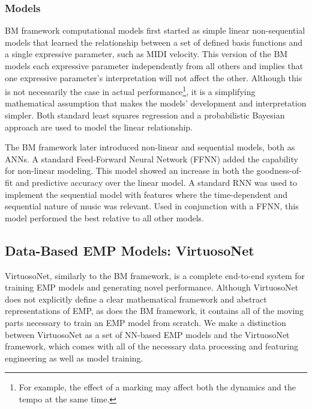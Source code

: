 \subsubsection{Models}
BM framework computational models first started as simple linear non-sequential models that learned the relationship between a set of defined basis functions and a single expressive parameter, such as MIDI velocity. This version of the BM models each expressive parameter independently from all others and implies that one expressive parameter's interpretation will not affect the other. Although this is not necessarily the case in actual performance\footnote{For example, the effect of a  marking may affect both the dynamics and the tempo at the same time.}, it is a simplifying mathematical assumption that makes the models' development and interpretation simpler. Both standard least squares regression and a probabilistic Bayesian approach are used to model the linear relationship. 

The BM framework later introduced non-linear and sequential models, both as ANNs. A standard Feed-Forward Neural Network (FFNN) added the capability for non-linear modeling. This model showed an increase in both the goodness-of-fit and predictive accuracy over the linear model. A standard RNN was used to implement the sequential model with features where the time-dependent and sequential nature of music was relevant. Used in conjunction with a FFNN, this model performed the best relative to all other models.

\newcommand{\vnet}{VirtuosoNet}
\newcommand{\vnetf}{VirtuosoNet framework}

\subsection{Data-Based EMP Models: \vnet{}}
\vnet{}, similarly to the BM framework, is a complete end-to-end system for training EMP models and generating novel performance. Although \vnet{} does not explicitly define a clear mathematical framework and abstract representations of EMP, as does the BM framework, it contains all of the moving parts necessary to train an EMP model from scratch. We make a distinction between \vnet{} as a set of NN-based EMP models and the \vnetf, which comes with all of the necessary data processing and featuring engineering as well as model training. 

